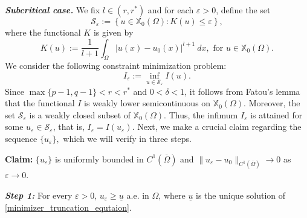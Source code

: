 \documentclass[reqno,oneside]{amsart}
\theoremstyle{definition}
\theoremstyle{remark}
\numberwithin{equation}{section}
\newcommand{\Om} {\Omega}
\newcommand{\xo}{\mathbb{X}_0}
\newcommand{\ul}{\underline{u}}
\begin{document}
\noindent\textbf{\textit{Subcritical case.}} We fix $l\in (r, r^*)$ and for each $\varepsilon>0$, define the set
\[\mathcal{S}_{\varepsilon}:= \left\{ u\in \xo (\Om) : K(u) \leq \varepsilon \right\},\]
where the functional $K$ is given by
\[K(u):= \frac{1}{l+1} \int_{\Om} |u(x) - u_0 (x)|^{l+1}\ dx, \text{ for } u\in \xo (\Om).\]
We consider the following constraint minimization problem:
\[I_{\varepsilon}:= \inf_{u\in \mathcal{S}_{\varepsilon}} I(u).\]
Since $\max \{p-1, q-1\} <r < r^*$ and $0<\delta <1$, it follows from Fatou's lemma that the functional $I$ is weakly lower semicontinuous on $\xo (\Om)$. Moreover, the set $\mathcal{S}_{\varepsilon}$ is a weakly closed subset of $\xo (\Om)$. Thus, the infimum $I_{\varepsilon}$ is attained for some $u_{\varepsilon}\in \mathcal{S}_{\varepsilon}$, that is, $I_{\varepsilon}=I(u_{\varepsilon})$. Next, we make a crucial claim regarding the sequence $\{u_\varepsilon\},$ which we will verify in three steps.
\vspace{5pt}

\noindent\textbf{Claim:} $\{u_\varepsilon\}$ is uniformly bounded in $C^{1}{(\overline{\Omega})}$ and $\|u_\varepsilon -u_0\|_{C^{1}(\overline{\Omega})}\rightarrow 0$ as $\varepsilon\rightarrow 0.$
\vspace{5pt}

\noindent\textit{\textbf{Step 1:}} For every $\varepsilon>0$, $u_{\varepsilon} \geq \ul$ a.e. in $\Om$, where $\ul$ is the unique solution of \eqref{minimizer_truncation_equtaion}.
\vspace{5pt}
\end{document}
